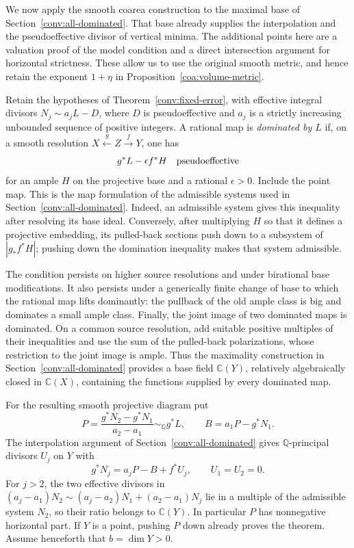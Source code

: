 We now apply the smooth coarea construction to the maximal base of
Section~\ref{conv:all-dominated}.  That base already supplies the
interpolation and the pseudoeffective divisor of vertical minima.
The additional points here are a valuation proof of the model
condition and a direct intersection argument for horizontal strictness.
These allow us to use the original smooth metric, and hence retain
the exponent $1+\eta$ in Proposition~\ref{coa:volume-metric}.

Retain the hypotheses of Theorem~\ref{conv:fixed-error}, with effective
integral divisors $N_j\sim a_jL-D$, where $D$ is pseudoeffective and
$a_j$ is a strictly increasing unbounded sequence of positive integers.
A rational map is \emph{dominated by $L$} if, on a smooth resolution
$X\xleftarrow{\ g\ }Z\xrightarrow{\ f\ }Y$, one has
\[
 g^*L-\epsilon f^*H\quad\hbox{pseudoeffective}
\]
for an ample $H$ on the projective base and a rational $\epsilon>0$.
Include the point map.  This is the map formulation of the admissible
systems used in Section~\ref{conv:all-dominated}.  Indeed, an
admissible system gives this inequality after resolving its base
ideal.  Conversely, after multiplying $H$ so that it defines a
projective embedding, its pulled-back sections push down to a
subsystem of $|g_*f^*H|$; pushing down the domination inequality
makes that system admissible.

The condition persists on higher source resolutions and under
birational base modifications.  It also persists under a generically
finite change of base to which the rational map lifts dominantly:
the pullback of the old ample class is big and dominates a small
ample class.  Finally, the joint image of two dominated maps is
dominated.  On a common source resolution, add suitable positive
multiples of their inequalities and use the sum of the pulled-back
polarizations, whose restriction to the joint image is ample.
Thus the maximality construction in Section~\ref{conv:all-dominated}
provides a base field $\mathbb C(Y)$, relatively algebraically closed
in $\mathbb C(X)$, containing the functions supplied by every
dominated map.

For the resulting smooth projective diagram put
\[
 P=\frac{g^*N_2-g^*N_1}{a_2-a_1}\sim_{\mathbb Q}g^*L,
 \qquad B=a_1P-g^*N_1.
\]
The interpolation argument of Section~\ref{conv:all-dominated} gives
$\mathbb Q$-principal divisors $U_j$ on $Y$ with
\begin{equation}\label{coa:interpolation}
 g^*N_j=a_jP-B+f^*U_j,\qquad U_1=U_2=0.
\end{equation}
For $j>2$, the two effective divisors in
$(a_j-a_1)N_2\sim(a_j-a_2)N_1+(a_2-a_1)N_j$ lie in a
multiple of the admissible system $N_2$, so their ratio belongs to
$\mathbb C(Y)$.  In particular $P$ has nonnegative horizontal
part.  If $Y$ is a point, pushing $P$ down already proves the theorem.
Assume henceforth that $b=\dim Y>0$.

